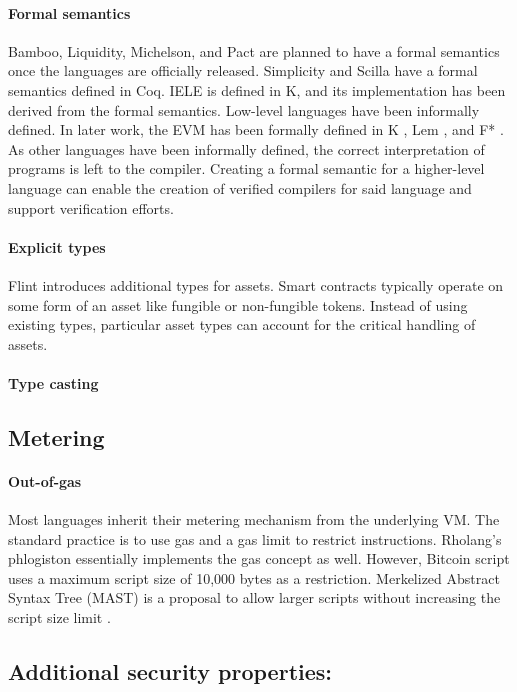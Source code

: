 \paragraph{Formal semantics}
Bamboo, Liquidity, Michelson, and Pact are planned to have a formal semantics once the languages are officially released.  Simplicity and Scilla have a formal semantics defined in Coq. IELE is defined in K, and its implementation has been derived from the formal semantics.
Low-level languages have been informally defined. In later work, the EVM has been formally defined in K \cite{Hildenbrandt2017}, Lem \cite{Hirai2017}, and F* \cite{Grishchenko2018}.
As other languages have been informally defined, the correct interpretation of programs is left to the compiler. Creating a formal semantic for a higher-level language can enable the creation of verified compilers for said language and support verification efforts.

\paragraph{Explicit types}
Flint introduces additional types for assets. Smart contracts typically operate on some form of an asset like fungible or non-fungible tokens. Instead of using existing types, particular asset types can account for the critical handling of assets.

\paragraph{Type casting}


\subsection{Metering}
\paragraph{Out-of-gas}

Most languages inherit their metering mechanism from the underlying VM. The standard practice is to use gas and a gas limit to restrict instructions. Rholang's phlogiston essentially implements the gas concept as well.
However, Bitcoin script uses a maximum script size of 10,000 bytes as a restriction. Merkelized Abstract Syntax Tree (MAST) is a proposal to allow larger scripts without increasing the script size limit \cite{Harding2017}.

\subsection{Additional security properties:} 
